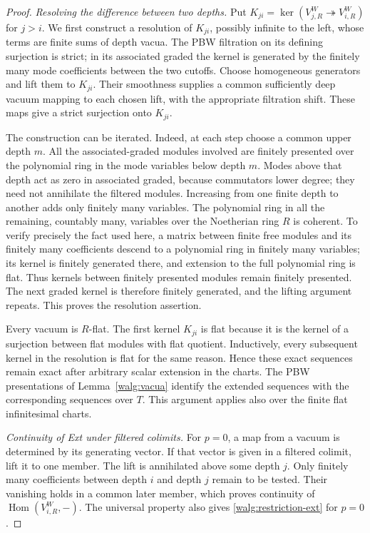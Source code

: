 \begin{proof}
\emph{Resolving the difference between two depths.}
Put \(K_{ji}=\ker(V_{j,R}^W\twoheadrightarrow V_{i,R}^W)\) for
\(j>i\).  We first construct a resolution of \(K_{ji}\), possibly
infinite to the left, whose terms are finite sums of depth vacua.
The PBW filtration on its defining surjection is strict; in its
associated graded the kernel is generated by the finitely many mode
coefficients between the two cutoffs.  Choose homogeneous generators
and lift them to \(K_{ji}\).  Their smoothness supplies a common
sufficiently deep vacuum mapping to each chosen lift, with the
appropriate filtration shift.  These maps give a strict surjection
onto \(K_{ji}\).

The construction can be iterated.  Indeed, at each step choose a
common upper depth \(m\).  All the associated-graded modules involved
are finitely presented over the polynomial ring in the mode variables
below depth \(m\).  Modes above that depth act as zero in associated
graded, because commutators lower degree; they need not annihilate the
filtered modules.  Increasing from one finite depth to another adds
only finitely many variables.  The polynomial ring in all the
remaining, countably many, variables over the Noetherian ring \(R\)
is coherent.  To verify precisely the fact used here, a matrix between
finite free modules and its finitely many coefficients descend to a
polynomial ring in finitely many variables; its kernel is finitely
generated there, and extension to the full polynomial ring is flat.
Thus kernels between finitely presented modules remain finitely
presented.  The next graded kernel is therefore finitely generated,
and the lifting argument repeats.  This proves the resolution
assertion.

Every vacuum is \(R\)-flat.  The first kernel \(K_{ji}\) is flat
because it is the kernel of a surjection between flat modules with
flat quotient.  Inductively, every subsequent kernel in the resolution
is flat for the same reason.  Hence these exact sequences remain
exact after arbitrary scalar extension in the charts.  The PBW
presentations of Lemma~\ref{walg:vacua} identify the extended sequences
with the corresponding sequences over \(T\).  This argument applies
also over the finite flat infinitesimal charts.

\smallskip
\noindent\emph{Continuity of Ext under filtered colimits.}
For \(p=0\), a map from a vacuum is determined by its generating
vector.  If that vector is given in a filtered colimit, lift it to
one member.  The lift is annihilated above some depth \(j\).
Only finitely many coefficients between depth \(i\) and depth \(j\)
remain to be tested.  Their vanishing holds in a common later member,
which proves continuity of \(\operatorname{Hom}(V_{i,R}^W,-)\).
The universal property also gives \eqref{walg:restriction-ext} for
\(p=0\).


\end{proof}
